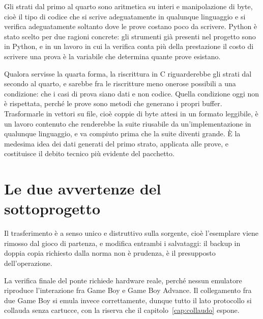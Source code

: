 Gli strati dal primo al quarto sono aritmetica su interi e manipolazione di byte, cioè il tipo di codice che si scrive adeguatamente in qualunque linguaggio e si verifica adeguatamente soltanto dove le prove costano poco da scrivere. Python è stato scelto per due ragioni concrete: gli strumenti già presenti nel progetto sono in Python, e in un lavoro in cui la verifica conta più della prestazione il costo di scrivere una prova è la variabile che determina quante prove esistano.

Qualora servisse la quarta forma, la riscrittura in C riguarderebbe gli strati dal secondo al quarto, e sarebbe fra le riscritture meno onerose possibili a una condizione: che i casi di prova siano dati e non codice. Quella condizione oggi non è rispettata, perché le prove sono metodi che generano i propri buffer. Trasformarle in vettori su file, cioè coppie di byte attesi in un formato leggibile, è un lavoro contenuto che renderebbe la suite riusabile da un'implementazione in qualunque linguaggio, e va compiuto prima che la suite diventi grande. È la medesima idea dei dati generati del primo strato, applicata alle prove, e costituisce il debito tecnico più evidente del pacchetto.

\section{Le due avvertenze del sottoprogetto}

Il trasferimento è a senso unico e distruttivo sulla sorgente, cioè l'esemplare viene rimosso dal gioco di partenza, e modifica entrambi i salvataggi: il backup in doppia copia richiesto dalla norma non è prudenza, è il presupposto dell'operazione.

La verifica finale del ponte richiede hardware reale, perché nessun emulatore riproduce l'interazione fra Game Boy e Game Boy Advance. Il collegamento fra due Game Boy si emula invece correttamente, dunque tutto il lato protocollo si collauda senza cartucce, con la riserva che il capitolo~\ref{cap:collaudo} espone.
